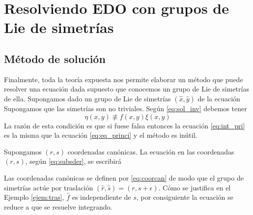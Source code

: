 \section{Resolviendo EDO con grupos de Lie de simetrías}
\subsection{Método de solución}
Finalmente, toda la teoría expuesta nos permite elaborar un método que puede resolver una ecuación dada supuesto que conocemos un grupo de Lie de simetrías de ella.  Supongamos dado  un grupo de Lie de simetrías $(\hat{x},\hat{y})$ de la ecuación
 Supongamos  que las simetrías son no triviales. Según \eqref{eq:sol_inv} debemos tener
 \[\eta(x,y)\not\equiv f(x,y)\xi(x,y)\]
La razón de esta condición es que si fuese falsa entonces la ecuación \eqref{eq:int_pri} es la misma que la ecuación \eqref{eq:eq_princi} y el método es inútil.

Supongamos $(r,s)$ coordenadas canónicas. La ecuación en las coordenadas $(r,s)$, según \eqref{eq:subsder}, se escribirá

Las coordenadas canónicas se definen por \eqref{eq:coorcan} de modo que el grupo de simetrías actúe por traslación $(\hat{r},\hat{s})=(r,s+\epsilon)$.
Cómo se justifica en el Ejemplo  \ref{ejem:tras}, $\hat{f}$ es independiente de $s$, por consiguiente la ecuación se reduce a
que se resuelve integrando.


